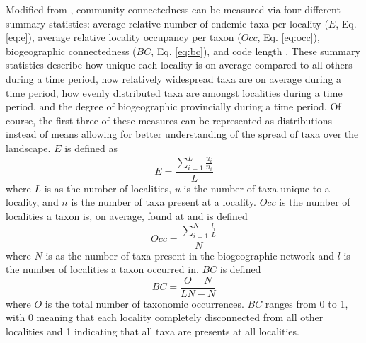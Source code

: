 \documentclass[12pt,letterpaper]{article}
\begin{document}
Modified from \citet{Sidor2013}, community connectedness can be measured via four different summary statistics: average relative number of endemic taxa per locality (\(E\), Eq. \ref{eq:e}), average relative locality occupancy per taxon (\(Occ\), Eq. \ref{eq:occ}), biogeographic connectedness (\(BC\), Eq. \ref{eq:bc}), and code length \citep{Rosvall2008,Rosvall2009a,Sidor2013}. These summary statistics describe how unique each locality is on average compared to all others during a time period, how relatively widespread taxa are on average during a time period, how evenly distributed taxa are amongst localities during a time period, and the degree of biogeographic provincially during a time period. Of course, the first three of these measures can be represented as distributions instead of means allowing for better understanding of the spread of taxa over the landscape. 
\(E\) is defined as 
\begin{equation}
  E = \frac{\sum_{i = 1}^{L} \frac{u_{i}}{n_{i}}}{L}
  \label{eq:e}
\end{equation}
where \(L\) is as the number of localities, \(u\) is the number of taxa unique to a locality, and \(n\) is the number of taxa present at a locality. \(Occ\) is the number of localities a taxon is, on average, found at and is defined
\begin{equation}
  Occ = \frac{\sum_{i = 1}^{N} \frac{l_{i}}{L}}{N}
  \label{eq:occ}
\end{equation}
where \(N\) is as the number of taxa present in the biogeographic network and \(l\) is the number of localities a taxon occurred in. \(BC\) is defined 
\begin{equation}
  BC = \frac{O - N}{LN - N}
  \label{eq:bc}
\end{equation}
where \(O\) is the total number of taxonomic occurrences. \(BC\) ranges from 0 to 1, with 0 meaning that each locality completely disconnected from all other localities and 1 indicating that all taxa are presents at all localities. 
\end{document}
